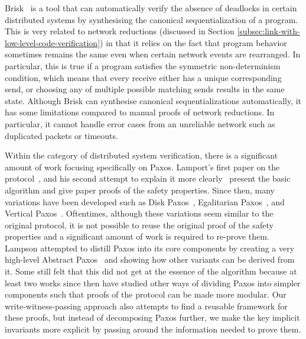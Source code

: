 Brisk~\cite{canonical} is a tool that can automatically verify the absence of deadlocks in certain distributed systems
by synthesising the canonical sequentialization of a program.
This is very related to network reductions (discussed in Section \ref{subsec:link-with-low-level-code-verification})
in that it relies on the fact that program behavior sometimes remains the same even when certain network events are rearranged.
In particular, this is true if a program satisfies the symmetric non-determinism condition, which means
that every receive either has a unique corresponding send, or choosing any of multiple possible matching sends results in the same state.
Although Brisk can synthesise canonical sequentializations automatically, it has some limitations compared to manual proofs
of network reductions.
In particular, it cannot handle error cases from an unreliable network such as duplicated packets or timeouts.

Within the category of distributed system verification, there is a significant amount of work focusing specifically on Paxos.
Lamport's first paper on the protocol~\cite{paxos}, and his second attempt to explain it more clearly~\cite{paxosmadesimple}
present the basic algorithm and give paper proofs of the safety properties.
Since then, many variations have been developed such as Disk Paxos~\cite{diskpaxos}, Egalitarian Paxos~\cite{epaxos},
and Vertical Paxos~\cite{vertpaxos}.
Oftentimes, although these variations seem similar to the original protocol, it is not possible to reuse the original
proof of the safety properties and a significant amount of work is required to re-prove them.
Lampson attempted to distill Paxos into its core components by creating a very high-level Abstract Paxos~\cite{Lampson2001}
and showing how other variants can be derived from it.
Some still felt that this did not get at the essence of the algorithm because at least two works since then \cite{dpaxos, sdpaxos}
have studied other ways of dividing Paxos into simpler components such that proofs of the protocol can be made more modular.
Our write-witness-passing approach also attempts to find a reusable framework for these proofs,
but instead of decomposing Paxos further, we make the key implicit invariants more explicit by passing around
the information needed to prove them.

